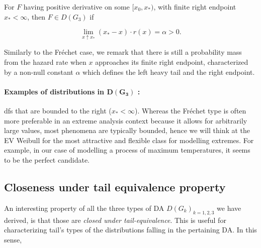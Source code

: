 \begin{theorem} For $F$ having positive derivative on some $[x_0,x_*)$, with finite right endpoint $x_*<\infty$, then $F\in D(G_{3})$ if

\begin{equation}
\displaystyle{\lim_{ x  \uparrow  x_*}}(x_*-x)\cdot r(x)=\alpha >0.%
\end{equation}
\end{theorem}
Similarly to the Fréchet case, we remark that there is still a probability mass from the hazard rate when $x$ approaches its finite right endpoint, characterized by a non-null constant $\alpha$ which defines the left heavy tail and the right endpoint.

\vspace{-0.1cm}
\paragraph*{Examples of distributions in $\boldsymbol{D(G_{3})}$ :} dfs that are bounded to the right ($x_*<\infty$). Whereas the Fréchet type is often more preferable in an extreme analysis context because it allows for arbitrarily large values, most phenomena are typically bounded, hence we will think at the EV Weibull for the most attractive and flexible class for modelling extremes. For example, in our case of modelling a process of maximum temperatures, it seems to be the perfect candidate.


\subsection{Closeness under tail equivalence property} An interesting property of all the three types of DA $D(G_{k})_{k=1,2,3}$ we have derived, is that those are \emph{closed under tail-equivalence}. This is useful for characterizing tail's types of the distributions falling in the pertaining DA. In this sense,

